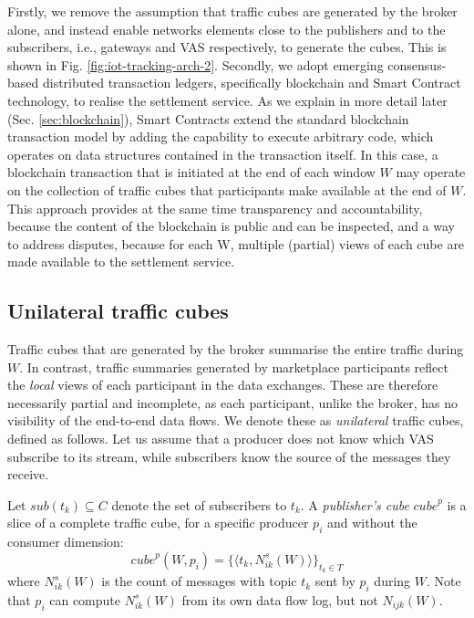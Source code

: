 \documentclass[chi_draft]{sigchi}
\begin{document}
Firstly, we remove the assumption that traffic cubes are generated by the broker alone, and instead enable networks elements close to the publishers and to the subscribers, i.e., gateways and VAS respectively, to generate the cubes. This is shown in Fig. \ref{fig:iot-tracking-arch-2}.
%
Secondly, we adopt emerging consensus-based distributed transaction ledgers, specifically blockchain and Smart Contract technology, to realise the settlement service.
As we explain in more detail later (Sec. \ref{sec:blockchain}), Smart Contracts extend the standard blockchain transaction model by adding the capability to execute arbitrary code, which operates on data structures contained in the transaction itself. 
In this case, a blockchain transaction that is initiated at the end of each window $W$ may operate on the collection of traffic cubes that participants make available at the end of $W$.
This  approach provides at the same time transparency and accountability, because the content of the blockchain is public and can be inspected, and a way to address disputes, because for each W, multiple (partial) views of each cube are made available to the settlement service.

\subsection{Unilateral traffic cubes} \label{sec:u-cubes}
Traffic cubes that are generated by the broker summarise the entire traffic during $W$.
In contrast, traffic summaries generated by marketplace participants reflect the \textit{local} views of each participant in the data exchanges.
These are therefore necessarily partial and incomplete, as each participant, unlike the broker, has no visibility of the end-to-end data flows. 
We denote these as \textit{unilateral} traffic cubes, defined as follows.
Let us assume that a producer does not know which VAS subscribe to its stream, while subscribers know the source of the messages they receive. 

Let $\mathit{sub}(t_k) \subseteq C $ denote the set of subscribers to $t_k$.
%
A \textit{publisher's cube} $\mathit{cube}^p$ is a slice of a complete traffic cube, for a specific producer $p_i$ and without the consumer dimension:
\[
\mathit{cube}^p(W, p_i)  =  \{ \langle t_k,  N^s_{ik}(W) \rangle \}_{t_k \in T}
\]
where $N^s_{ik}(W)$ is the count of messages with topic $t_k$ sent by $p_i$ during $W$.
Note that $ p_i $ can compute $ N^s_{ik}(W)  $ from its own data flow log, but not $ N_{ijk}(W)  $.
\end{document}
